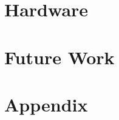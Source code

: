 \documentclass[final,12pt,twoside]{mcthesis}
\begin{document}
\newpage
\chapter{Hardware}

\newpage


\newpage


\newpage
\chapter{Future Work}




\appendix
\chapter{Appendix}

\label{body end}
\end{document}
